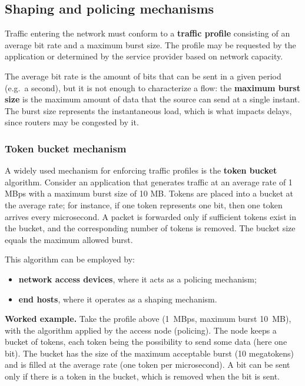 \subsection{Shaping and policing mechanisms}

Traffic entering the network must conform to a \textbf{traffic profile} consisting of an average bit rate and a maximum burst size. The profile may be requested by the application or determined by the service provider based on network capacity.

The average bit rate is the amount of bits that can be sent in a given period (e.g.\ a second), but it is not enough to characterize a flow: the \textbf{maximum burst size} is the maximum amount of data that the source can send at a single instant. The burst size represents the instantaneous load, which is what impacts delays, since routers may be congested by it.

\subsubsection*{Token bucket mechanism}

A widely used mechanism for enforcing traffic profiles is the \textbf{token bucket} algorithm. Consider an application that generates traffic at an average rate of 1 MBps with a maximum burst size of 10 MB. Tokens are placed into a bucket at the average rate; for instance, if one token represents one bit, then one token arrives every microsecond. A packet is forwarded only if sufficient tokens exist in the bucket, and the corresponding number of tokens is removed. The bucket size equals the maximum allowed burst.

\begin{center}
\end{center}

This algorithm can be employed by:

\begin{itemize}
\item \textbf{network access devices}, where it acts as a policing mechanism;
\item \textbf{end hosts}, where it operates as a shaping mechanism.
\end{itemize}

\textbf{Worked example.} Take the profile above (1~MBps, maximum burst 10~MB), with the algorithm applied by the access node (policing). The node keeps a bucket of tokens, each token being the possibility to send some data (here one bit). The bucket has the size of the maximum acceptable burst (10 megatokens) and is filled at the average rate (one token per microsecond). A bit can be sent only if there is a token in the bucket, which is removed when the bit is sent.

